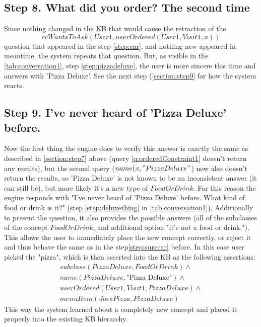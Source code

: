 \subsection{Step 8. What did you order? The second time}
\label{section:step8}
Since nothing changed in the KB that would cause the retraction of the 
\begin{equation*}
ccWantsToAsk(User1,userOrdered(User1,Visit1,x))
\end{equation*}
question that appeared in the
step \ref{step:car}, and nothing new appeared in meantime, the system repeats
that question. But, as visible in the \autoref{tab:conversation1}, step 
\ref{step:pizzadeluxe}, the user is more sincere this time and answers with
'Pizza Deluxe'. See the next step (\autoref{section:step9} for how the system 
reacts.

\subsection{Step 9. I've never heard of 'Pizza Deluxe' before.}
\label{section:step9}
Now the first thing the engine does to verify this answer is exactly the same 
as described in \autoref{section:step7} above 
(query \ref{q:orderedConstraint1} doesn't return any results), but the second
query ($name(x,"Pizza Deluxe"$) now also doesn't return the results, so 
'Pizza Deluxe' is not known to be an inconsistent answer (it can still be), but
more likely it's a new type of $FoodOrDrink$. For this reason the engine
responds with "I've never heard of 'Pizza Deluxe' before. What kind of
food or drink is it?" (step \ref{step:deluxething} in 
\autoref{tab:conversation1}). Additionally to present the question, it also
provides the possible answers (all of the subclasses of the concept 
$FoodOrDrink$, and additional option "it's not a food or drink."). This allows
the user to immediately place the new concept correctly, or reject it and 
thus behave the same as in the step\ref{step:surecar} before. In this case
user picked the "pizza", which is then asserted into the KB as the 
following assertions:
\begin{equation}
\begin{gathered}
subclass(PizzaDeluxe,FoodOrDrink) \land \\
name(PizzaDeluxe, \text{"Pizza Deluxe"}) \land \\
userOrdered(User1,Visit1,PizzaDeluxe) \land \\
menuItem(JoesPizza,PizzaDeluxe)
\end{gathered}
\end{equation}
This way the system learned about a completely new concept and placed it properly
into the existing KB hierarchy.

